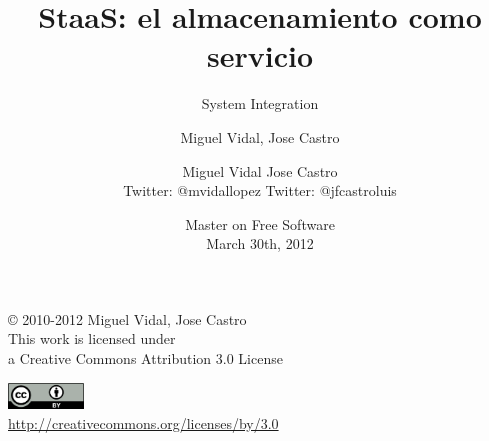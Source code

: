\documentclass{beamer}
\begin{document}
\title{StaaS: el almacenamiento como servicio}
\subtitle{System Integration}
\author{Miguel Vidal, Jose Castro} 
\date{\footnotesize{Master on Free Software \\ March 30th, 2012}}
\author{Miguel Vidal \hspace{1cm} Jose Castro \\
\hspace{0.5mm} {\tiny Twitter: @mvidallopez \hspace{1.1cm}Twitter: @jfcastroluis}
}



\begin{frame}
  \vspace{2cm}
  \begin{flushright}
    {\small \copyright{} 2010-2012 Miguel Vidal, Jose Castro} \\
    \medskip
    {\scriptsize This work is licensed under \\ a Creative Commons Attribution 3.0 License}
  \end{flushright}
  \begin{flushright}
    \href{http://creativecommons.org/licenses/by/3.0/es}{\includegraphics[width=2cm]{format/cc-by.png}} \\
    {\tiny \url{http://creativecommons.org/licenses/by/3.0}}
  \end{flushright}
\end{frame}%

\usebackgroundtemplate{}

\end{document}
